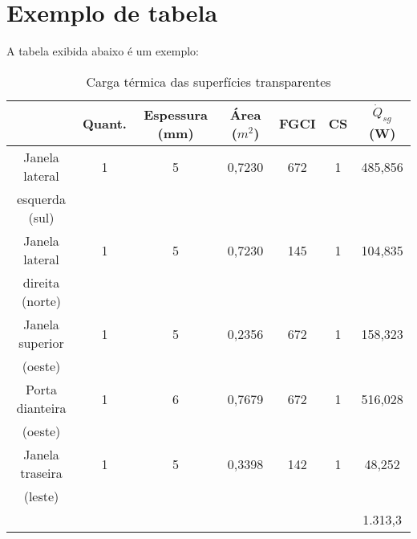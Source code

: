 \documentclass[12pt,oneside,english,brazil,lmodern]{ucsmonograph}
\begin{document}
	\section{Exemplo de tabela}
	A tabela exibida abaixo é um exemplo:
	\begin{table}[!ht]
		\centering
		\caption{Carga térmica das superfícies transparentes}
		\label{ct-transp}
		\setlength{\doublerulesep}{\arrayrulewidth}
		\begin{tabular}{c|c|c|c|c|c|c}
			\hline
			\hline
			& Quant. & Espessura (mm) & Área ($m^2$) & FGCI & CS & $\dot{Q}_{sg}$ (W) \\ \hline
			Janela lateral  & 1 & 5 & 0,7230 & 672 & 1 & 485,856  \\ 
			esquerda (sul)  &   &   &        &     &   &          \\ 
			Janela lateral  & 1 & 5 & 0,7230 & 145 & 1 &  104,835 \\
			direita (norte) &   &   &        &     &   &          \\
			Janela superior & 1 & 5 & 0,2356 & 672 & 1 & 158,323  \\
			(oeste)         &   &   &        &     &   &          \\
			Porta dianteira & 1 & 6 & 0,7679 & 672 & 1 & 516,028  \\
			(oeste)         &   &   &        &     &   &          \\
			Janela traseira & 1 & 5 & 0,3398 & 142 & 1 &  48,252  \\
			(leste)         &   &   &        &     &   &          \\ \hline 
			&   &   &        &     &   &  1.313,3 \\ \hline \hline 
		\end{tabular}
	\end{table}
	
	\postextual
	
	
	
\end{document}
